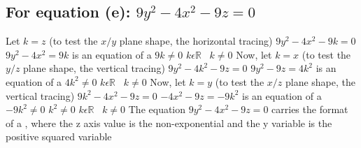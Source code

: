 \documentclass{article}
\begin{document}
\subsection*{For equation (e): $ 9y^2-4x^2-9z=0$}
Let $k=z$ (to test the $x/y$ plane shape, the horizontal tracing)
\vfill $ 9y^2-4x^2-9k=0$
\vfill $ 9y^2-4x^2=9k$ is an equation of a 
\vfill $ 9k \neq 0$
\vfill $ k \epsilon \mathbb{R}\;\;\; k \neq 0$
\vfill Now, let $k=x$ (to test the $y/z$ plane shape, the vertical tracing)
\vfill $ 9y^2-4k^2-9z=0$
\vfill $ 9y^2-9z=4k^2$ is an equation of a 
\vfill $ 4k^2 \neq 0$
\vfill $ k \epsilon \mathbb{R}\;\;\;  k \neq 0$
\vfill Now, let $k=y$ (to test the $x/z$ plane shape, the vertical tracing)
\vfill $ 9k^2-4x^2-9z=0$
\vfill $ -4x^2-9z=-9k^2$ is an equation of a 
\vfill $ -9k^2 \neq 0$
\vfill $ k^2 \neq 0$
\vfill $ k \epsilon \mathbb{R}\;\;\;  k \neq 0$
\vfill The equation $ 9y^2-4x^2-9z=0$ carries the format of a , where the z axis value is the non-exponential and the y variable is the positive squared variable\\[3in]

\pagebreak
\end{document}
